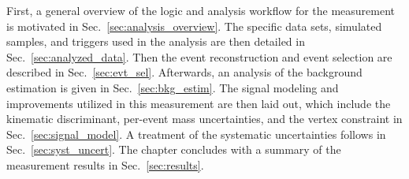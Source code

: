 First, a general overview of the logic and analysis workflow for the \mH measurement is motivated in Sec.~\ref{sec:analysis_overview}.
The specific data sets, simulated samples, and triggers used in the analysis are then detailed in Sec.~\ref{sec:analyzed_data}.
Then the event reconstruction and event selection are described in Sec.~\ref{sec:evt_sel}.
Afterwards, an analysis of the background estimation is given in Sec.~\ref{sec:bkg_estim}.
The signal modeling and improvements utilized in this measurement are then laid out, which include the kinematic discriminant, per-event mass uncertainties, and the vertex constraint in Sec.~\ref{sec:signal_model}.
A treatment of the systematic uncertainties follows in Sec.~\ref{sec:syst_uncert}.
The chapter concludes with a summary of the \mH measurement results in Sec.~\ref{sec:results}.

